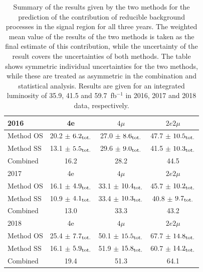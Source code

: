 \begin{table}[h]
   \centering
   \begin{tabular}{| l | c | c | c |}
\hline
2016            & 4e                             & $4\mu$                          & $2e2\mu$       \\
\hline \hline
Method OS       & 20.2 $\pm$ $6.2_{\rm tot.}$    & 27.0 $\pm$ $8.6_{\rm tot.}$     & 47.7 $\pm$ $10.5_{\rm tot.}$    \\
Method SS       & 13.1 $\pm$ $5.5_{\rm tot.}$    & 29.6 $\pm$ $9.0_{\rm tot.}$     & 41.5 $\pm$ $10.3_{\rm tot.}$     \\
Combined        & 16.2   & 28.2    & 44.5  \\
\hline
2017            & 4e         & $4\mu$                      & $2e2\mu$       \\
\hline \hline
Method OS       & 16.1 $\pm$ $4.9_{\rm tot.}$    & 33.1 $\pm$ $10.4_{\rm tot.}$    & 45.7 $\pm$ $10.2_{\rm tot.}$    \\
Method SS       & 10.9 $\pm$ $4.1_{\rm tot.}$    & 33.4 $\pm$ $10.3_{\rm tot.}$    & 40.8 $\pm$ $9.7_{\rm tot.}$    \\
Combined        & 13.0   & 33.3    & 43.2  \\
\hline
2018            & 4e         & $4\mu$                      & $2e2\mu$       \\
\hline \hline
Method OS       & 25.4 $\pm$ $7.7_{\rm tot.}$    & 50.1 $\pm$ $15.5_{\rm tot.}$    & 67.7 $\pm$ $14.8_{\rm tot.}$    \\
Method SS       & 16.1 $\pm$ $5.9_{\rm tot.}$    & 51.9 $\pm$ $15.8_{\rm tot.}$    & 60.7 $\pm$ $14.2_{\rm tot.}$    \\
Combined        & 19.4   & 51.3    & 64.1  \\
\hline
 \end{tabular}
    \caption{
    Summary of the results given by the two methods for the prediction of the contribution of reducible background processes in the signal region for all three years. The weighted mean value of the results of the two methods is taken as the final estimate of this contribution, while the uncertainty of the result covers the uncertainties of both methods. The table shows symmetric individual uncertainties for the two methods, while these are treated as asymmetric in the combination and statistical analysis. Results are given for an integrated luminosity of 35.9, 41.5 and 59.7~fb$^{-1}$ in 2016, 2017 and 2018 data, respectively. 
    }
    \label{tab:reducibleSummary}
\end{table}




















